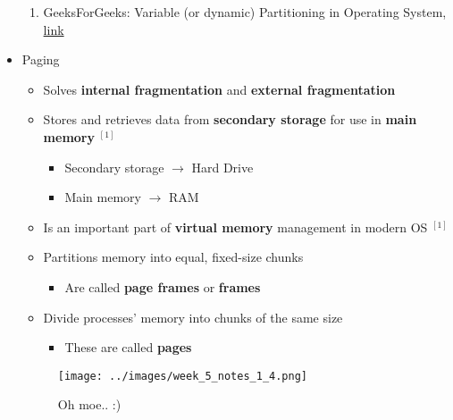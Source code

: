 \documentclass[12pt]{article}
\begin{document}
\begin{itemize}
    \begin{enumerate}[1)]
        \item GeeksForGeeks: Variable (or dynamic) Partitioning in Operating System, \href{https://www.geeksforgeeks.org/variable-or-dynamic-partitioning-in-operating-system/}{link}
    \end{enumerate}
    \item Paging
    \begin{itemize}
        \item Solves \textbf{internal fragmentation} and \textbf{external fragmentation}
        \item Stores and retrieves data from \textbf{secondary storage} for use
        in \textbf{main memory} $^{[1]}$
        \begin{itemize}
            \item Secondary storage $\to$ Hard Drive
            \item Main memory $\to$ RAM
        \end{itemize}
        \item Is an important part of \textbf{virtual memory} management in modern
        OS $^{[1]}$
        \item Partitions memory into equal, fixed-size chunks
        \begin{itemize}
            \item Are called \textbf{page frames} or \textbf{frames}
        \end{itemize}
        \item Divide processes' memory into chunks of the same size
        \begin{itemize}
            \item These are called \textbf{pages}
        \end{itemize}
    \end{itemize}

    \begin{figure}[h!]
    \texttt{[image: ../images/week\_5\_notes\_1\_4.png]}
    \caption{Oh moe.. :)}
    \end{figure}


\end{itemize}
\end{document}
